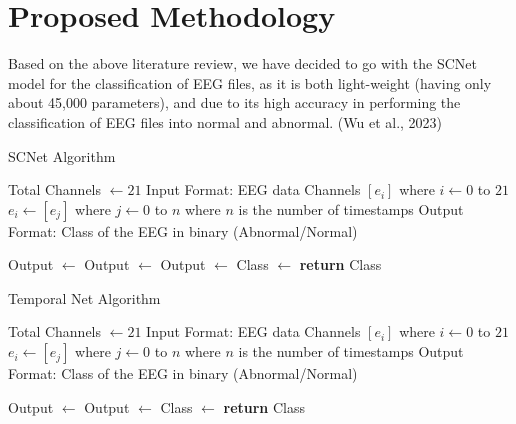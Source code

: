 \documentclass[11pt]{article}
\begin{document}
\section{Proposed Methodology}
Based on the above literature review, we have decided to go with the SCNet model for the classification of EEG files, as it is both light-weight (having only about 45,000 parameters), and due to its high accuracy in performing the classification of EEG files into normal and abnormal. (Wu et al., 2023)

\begin{algorithm}
    \caption{SCNet Algorithm}
    \begin{algorithmic}[1]
         
        \State Total Channels $\gets 21$
        \State Input Format: EEG data Channels $[e_i]$ where $i \gets 0$ to $21$
        \State $e_i \gets [e_j]$ where $j \gets 0$ to $n$ where $n$ is the number of timestamps
        \State 
        \State Output Format: Class of the EEG in binary (Abnormal/Normal)
        \State

        \State Output $\gets$  
        \State Output $\gets$ 
        \State Output $\gets$ 
        \State Class $\gets$ 
        \State \textbf{return} Class
        \EndProcedure
    \end{algorithmic}
\end{algorithm}

\begin{algorithm}
    \caption{Temporal Net Algorithm}
    \begin{algorithmic}[1]
         
        \State Total Channels $\gets 21$
        \State Input Format: EEG data Channels $[e_i]$ where $i \gets 0$ to $21$
        \State $e_i \gets [e_j]$ where $j \gets 0$ to $n$ where $n$ is the number of timestamps
        \State 
        \State Output Format: Class of the EEG in binary (Abnormal/Normal)
        \State

        \State Output $\gets$  
        \State Output $\gets$ 
        \State Class $\gets$ 
        \State \textbf{return} Class
        \EndProcedure
    \end{algorithmic}

\end{algorithm}
\end{document}
